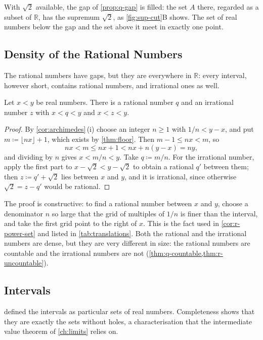 With $\sqrt2$ available, the gap of \cref{prop:q-gap} is filled: the set $A$ there, regarded as a subset of $\mathbb R$, has the supremum $\sqrt2$, as \cref{fig:sup-cut}B shows. The set of real numbers below the gap and the set above it meet in exactly one point.

\subsection{Density of the Rational Numbers}

The rational numbers have gaps, but they are everywhere in $\mathbb R$: every interval, however short, contains rational numbers, and irrational ones as well.

\begin{theorem}[Density]
\label{thm:q-dense}
Let $x<y$ be real numbers. There is a rational number $q$ and an irrational number $z$ with $x<q<y$ and $x<z<y$.
\end{theorem}

\begin{proof}
By \cref{cor:archimedes}\,(i) choose an integer $n\ge1$ with $1/n<y-x$, and put $m\coloneqq\lfloor nx\rfloor+1$, which exists by \cref{thm:floor}. Then $m-1\le nx<m$, so
\[
nx<m\le nx+1<nx+n(y-x)=ny ,
\]
and dividing by $n$ gives $x<m/n<y$. Take $q\coloneqq m/n$. For the irrational number, apply the first part to $x-\sqrt2<y-\sqrt2$ to obtain a rational $q'$ between them; then $z\coloneqq q'+\sqrt2$ lies between $x$ and $y$, and it is irrational, since otherwise $\sqrt2=z-q'$ would be rational.
\end{proof}

The proof is constructive: to find a rational number between $x$ and $y$, choose a denominator $n$ so large that the grid of multiples of $1/n$ is finer than the interval, and take the first grid point to the right of $x$. This is the fact used in \cref{cor:r-power-set} and listed in \cref{tab:translations}. Both the rational and the irrational numbers are dense, but they are very different in size: the rational numbers are countable and the irrational numbers are not (\cref{thm:q-countable,thm:r-uncountable}).

\subsection{Intervals}

 defined the intervals as particular sets of real numbers. Completeness shows that they are exactly the sets without holes, a characterisation that the intermediate value theorem of \cref{ch:limits} relies on.

